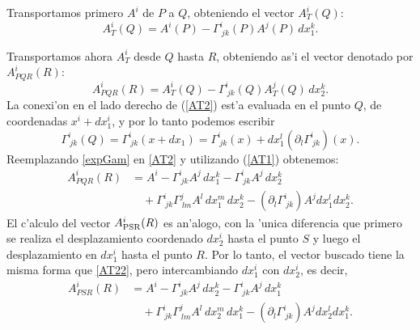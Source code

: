 Transportamos primero $A^i$ de $P$ a $Q$, obteniendo el vector $A_{T}^i(Q)$:
\begin{equation}
A_{T}^i(Q)=A^i(P) -\Gamma_{\ jk}^i(P)A^j(P)\, dx_1^k .
\label{AT1}%
\end{equation}

Transportamos ahora $A_{T}^i $ desde $Q$ hasta $R$, obteniendo as'i el vector denotado por $A_{PQR}^i (R)$:
\begin{equation}
A_{PQR}^i (R) = A_{T}^i (Q) -\Gamma_{\ jk}^i(Q)A_{T}^j (Q)\,dx_2^k. \label{AT2}%
\end{equation}
 La conexi'on en el lado derecho de (\ref{AT2}) est'a evaluada en el punto $Q$, de coordenadas $x^i +dx_1^i$, y por lo tanto podemos escribir
\begin{equation}
\Gamma_{\ jk}^i(Q)=\Gamma_{\ jk}^i (x+dx_1)=\Gamma_{\ jk}^i(x)+dx_1^l(\partial_l\Gamma_{\ jk}^i) (x) . \label{expGam}
\end{equation}
Reemplazando \eqref{expGam} en \eqref{AT2} y utilizando (\ref{AT1}) obtenemos:%
\begin{align}
A_{PQR}^i (R) &= A^i -\Gamma_{\ jk}^i A^j\,dx_1^k-\Gamma_{\ jk}^i A^j\,dx_2^k \nonumber\\
& \quad  +\Gamma_{\ jk}^i \Gamma_{\ lm}^jA^l\, dx_1^m\,dx_2^k -(\partial_l\Gamma_{\ jk}^i) A^j dx_1^l dx_2^k. \label{AT22}
\end{align}
El c'alculo del vector $A_{\rm PSR}^i(R)$ es an'alogo, con la 'unica diferencia que primero se realiza el desplazamiento coordenado $dx_2^i$ hasta el punto $S$ y luego el desplazamiento en $dx_1^i$ hasta el punto $R$. Por lo tanto, el vector buscado tiene la misma forma que \eqref{AT22}, pero intercambiando $dx_1^i$ con $dx_2^i$, es decir,
\begin{align}
A_{PSR}^i (R) &= A^i -\Gamma_{\ jk}^i A^j\,dx_2^k-\Gamma_{\ jk}^i A^j\,dx_1^k \nonumber\\
& \quad  +\Gamma_{\ jk}^i \Gamma_{\ lm}^jA^l\, dx_2^m\,dx_1^k -(\partial_l\Gamma_{\ jk}^i) A^j dx_2^l dx_1^k. \label{APSR}
\end{align}


